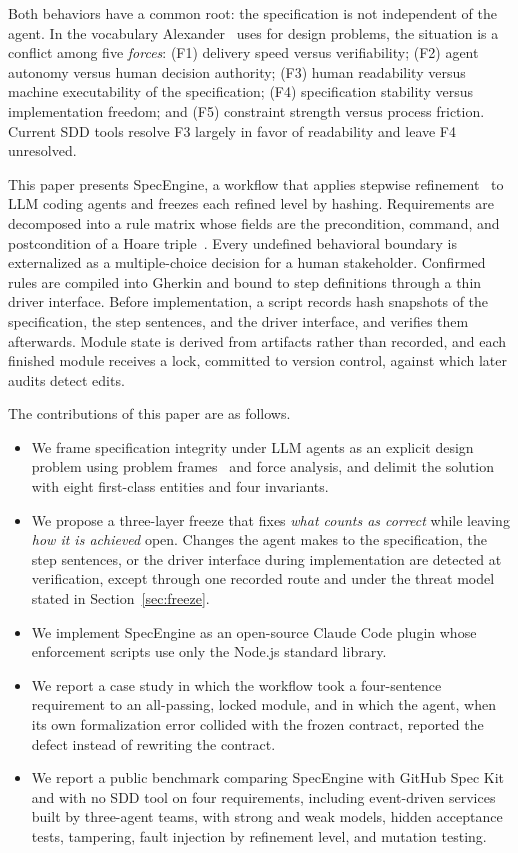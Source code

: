 \documentclass[conference]{IEEEtran}
\begin{document}
Both behaviors have a common root: the specification is not independent of the agent. In the vocabulary Alexander~\cite{alexander1979timeless} uses for design problems, the situation is a conflict among five \emph{forces}: (F1) delivery speed versus verifiability; (F2) agent autonomy versus human decision authority; (F3) human readability versus machine executability of the specification; (F4) specification stability versus implementation freedom; and (F5) constraint strength versus process friction. Current SDD tools resolve F3 largely in favor of readability and leave F4 unresolved.

This paper presents SpecEngine, a workflow that applies stepwise refinement~\cite{wirth1971stepwise} to LLM coding agents and freezes each refined level by hashing. Requirements are decomposed into a rule matrix whose fields are the precondition, command, and postcondition of a Hoare triple~\cite{hoare1969axiomatic}. Every undefined behavioral boundary is externalized as a multiple-choice decision for a human stakeholder. Confirmed rules are compiled into Gherkin and bound to step definitions through a thin driver interface. Before implementation, a script records hash snapshots of the specification, the step sentences, and the driver interface, and verifies them afterwards. Module state is derived from artifacts rather than recorded, and each finished module receives a lock, committed to version control, against which later audits detect edits.

The contributions of this paper are as follows.
\begin{itemize}
\item We frame specification integrity under LLM agents as an explicit design problem using problem frames~\cite{jackson2001problem} and force analysis, and delimit the solution with eight first-class entities and four invariants.
\item We propose a three-layer freeze that fixes \emph{what counts as correct} while leaving \emph{how it is achieved} open. Changes the agent makes to the specification, the step sentences, or the driver interface during implementation are detected at verification, except through one recorded route and under the threat model stated in Section~\ref{sec:freeze}.
\item We implement SpecEngine as an open-source Claude Code plugin whose enforcement scripts use only the Node.js standard library.
\item We report a case study in which the workflow took a four-sentence requirement to an all-passing, locked module, and in which the agent, when its own formalization error collided with the frozen contract, reported the defect instead of rewriting the contract.
\item We report a public benchmark comparing SpecEngine with GitHub Spec Kit and with no SDD tool on four requirements, including event-driven services built by three-agent teams, with strong and weak models, hidden acceptance tests, tampering, fault injection by refinement level, and mutation testing.
\end{itemize}
\end{document}
